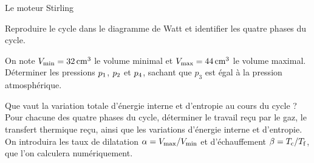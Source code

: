 \begin{exo}[PC][1][colle]{Le moteur Stirling}
\begin{quest}
  \item Reproduire le cycle dans le diagramme de Watt et identifier les quatre phases du cycle.




  \item On note $V_{\rm min}=\SI{32}{cm^3}$ le volume minimal et $V_{\rm max}=\SI{44}{cm^3}$ le volume maximal. Déterminer les pressions $p_{\rm 1}$, $p_{\rm 2}$ et $p_{\rm 4}$, sachant que $p_3$ est égal à la pression atmosphérique.


  \item Que vaut la variation totale d'énergie interne et d'entropie au cours du cycle ? Pour chacune des quatre phases du cycle, déterminer le travail reçu par le gaz, le transfert thermique reçu, ainsi que les variations d'énergie interne et d'entropie. On introduira les taux de dilatation $\alpha=V_{\rm max}/V_{\rm min}$ et d'échauffement $\beta=T_{\rm c}/T_{\rm f}$, que l'on calculera numériquement.




\end{quest}
\end{exo}
